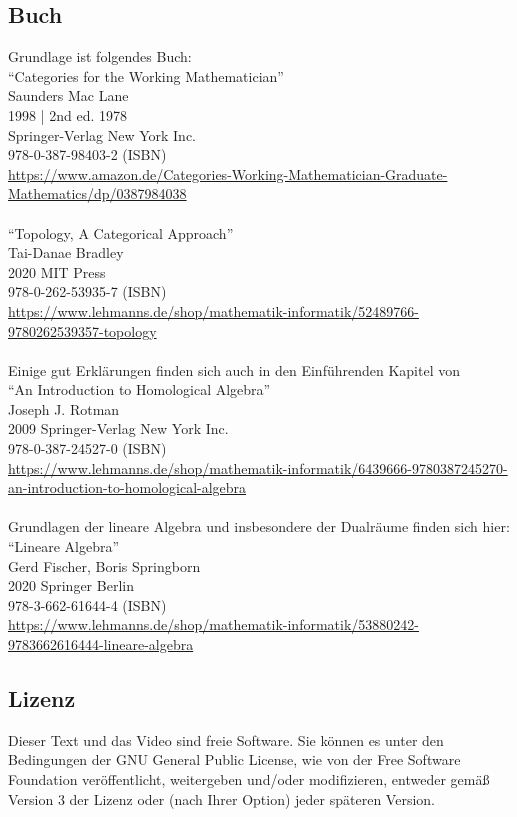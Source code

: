 \documentclass[a4paper]{amsart}
\theoremstyle{definition}
\begin{document}
\subsection*{Buch}
Grundlage ist folgendes Buch:\\
"`Categories for the Working Mathematician"'\\
Saunders Mac Lane\\
1998 | 2nd ed. 1978\\
Springer-Verlag New York Inc.\\
978-0-387-98403-2 (ISBN)\\
{\tiny
   \url{https://www.amazon.de/Categories-Working-Mathematician-Graduate-Mathematics/dp/0387984038}}\\
\\
"`Topology, A Categorical Approach"'\\
Tai-Danae Bradley\\
2020 MIT Press\\
978-0-262-53935-7 (ISBN)\\ 
{\tiny
\url{https://www.lehmanns.de/shop/mathematik-informatik/52489766-9780262539357-topology}}\\
\\
Einige gut Erklärungen finden sich auch in den Einführenden Kapitel von\\
"`An Introduction to Homological Algebra"'\\
Joseph J. Rotman\\
2009 Springer-Verlag New York Inc.\\
978-0-387-24527-0 (ISBN)\\ 
{\tiny \url{https://www.lehmanns.de/shop/mathematik-informatik/6439666-9780387245270-an-introduction-to-homological-algebra}}\\
\\
Grundlagen der lineare Algebra und insbesondere der Dualräume finden sich hier:\\
"`Lineare Algebra"'\\
Gerd Fischer, Boris Springborn\\
2020 Springer Berlin\\
978-3-662-61644-4 (ISBN)\\
{\tiny \url{https://www.lehmanns.de/shop/mathematik-informatik/53880242-9783662616444-lineare-algebra}}


\subsection*{Lizenz}
Dieser Text und das Video sind freie Software. Sie können es unter den Bedingungen der 
GNU General Public License, wie von der Free Software Foundation veröffentlicht, weitergeben 
und/oder modifizieren, entweder gemäß Version 3 der Lizenz oder (nach Ihrer Option) jeder späteren Version.
\end{document}
